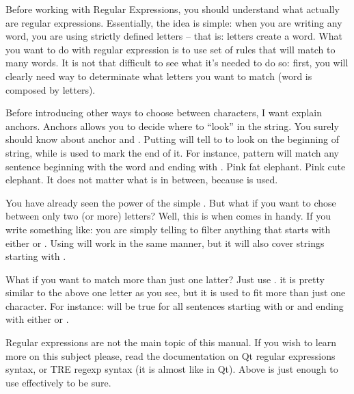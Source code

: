 Before working with Regular Expressions, you should understand what actually are regular expressions. Essentially, the idea is simple:
when you are writing any word, you are using strictly defined letters -- that is: letters create a word. What you want to do with regular
expression is to use set of rules that will match to many words. It is not that difficult to see what it's needed to do so: first,
you will clearly need way to determinate what letters you want to match (word is composed by letters).

Before introducing other ways to choose between characters, I want explain anchors. Anchors allows you to decide where to ``look'' in the string.
You surely should know about \mono{\textasciicircum} anchor and \mono{\textdollar}. Putting \mono{\textasciicircum} will tell to \OCS{}
to look on the beginning of string, while \mono{\textdollar} is used to mark the end of it. For instance, pattern
 will match any sentence beginning with the word  and ending with
. Pink fat elephant. Pink cute elephant. It does not matter what is in between, because  is used.

You have already seen the power of the simple . But what if you want to chose between only two (or more) letters? Well, this is when
\mono{[|]} comes in handy. If you write something like:  you are simply telling \OCS{} to filter anything that
starts with either  or . Using  will work in the same manner, but it will also cover
strings starting with .

What if you want to match more than just one latter? Just use \mono{(|)}. it is pretty similar to the above one letter as you see, but it is
used to fit more than just one character. For instance:  will be
true for all sentences starting with  or  and ending with either  or .

Regular expressions are not the main topic of this manual. If you wish to learn more on this subject please, read the documentation on
Qt regular expressions syntax, or TRE regexp syntax (it is almost like in Qt). Above is just enough to use \OCS{} effectively to be sure.

